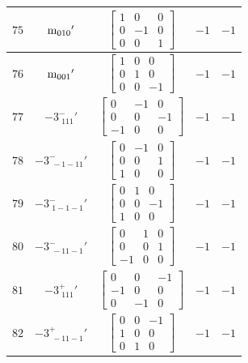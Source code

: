 \documentclass[fleqn,8pt]{jsarticle}
\begin{document}
\begin{longtable}{ccccc}
$ 75 $ & $ {\rm m}_{010}{}' $ & $ \begin{bmatrix} 1 & 0 & 0 \\ 0 & -1 & 0 \\ 0 & 0 & 1 \end{bmatrix} $ & $ -1 $ & $ -1 $ \\ \hline
$ 76 $ & $ {\rm m}_{001}{}' $ & $ \begin{bmatrix} 1 & 0 & 0 \\ 0 & 1 & 0 \\ 0 & 0 & -1 \end{bmatrix} $ & $ -1 $ & $ -1 $ \\ \hline
$ 77 $ & $ -3^{-}_{\,\,111}{}' $ & $ \begin{bmatrix} 0 & -1 & 0 \\ 0 & 0 & -1 \\ -1 & 0 & 0 \end{bmatrix} $ & $ -1 $ & $ -1 $ \\ \hline
$ 78 $ & $ -3^{-}_{\,\,-1-11}{}' $ & $ \begin{bmatrix} 0 & -1 & 0 \\ 0 & 0 & 1 \\ 1 & 0 & 0 \end{bmatrix} $ & $ -1 $ & $ -1 $ \\ \hline
$ 79 $ & $ -3^{-}_{\,\,1-1-1}{}' $ & $ \begin{bmatrix} 0 & 1 & 0 \\ 0 & 0 & -1 \\ 1 & 0 & 0 \end{bmatrix} $ & $ -1 $ & $ -1 $ \\ \hline
$ 80 $ & $ -3^{-}_{\,\,-11-1}{}' $ & $ \begin{bmatrix} 0 & 1 & 0 \\ 0 & 0 & 1 \\ -1 & 0 & 0 \end{bmatrix} $ & $ -1 $ & $ -1 $ \\ \hline
$ 81 $ & $ -3^{+}_{\,\,111}{}' $ & $ \begin{bmatrix} 0 & 0 & -1 \\ -1 & 0 & 0 \\ 0 & -1 & 0 \end{bmatrix} $ & $ -1 $ & $ -1 $ \\ \hline
$ 82 $ & $ -3^{+}_{\,\,-11-1}{}' $ & $ \begin{bmatrix} 0 & 0 & -1 \\ 1 & 0 & 0 \\ 0 & 1 & 0 \end{bmatrix} $ & $ -1 $ & $ -1 $ \\ \hline

\end{longtable}
\end{document}

